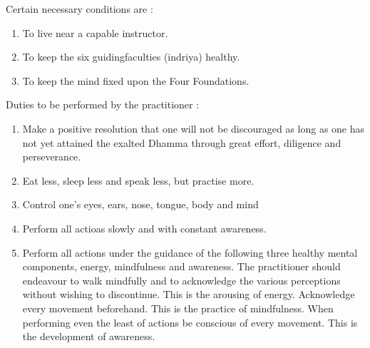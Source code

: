 \documentclass[a5paper,10pt,english]{book}
\begin{document}
\sphinxAtStartPar
{} Certain necessary conditions are :
\begin{enumerate}
%
\item {} 
\sphinxAtStartPar
To live near a capable instructor.

\item {} 
\sphinxAtStartPar
To keep the six guiding\sphinxhyphen{}faculties (indriya) healthy.

\item {} 
\sphinxAtStartPar
To keep the mind fixed upon the Four Foundations.

\end{enumerate}

\sphinxAtStartPar
Duties to be performed by the practitioner :\sphinxhyphen{}
\begin{enumerate}
%
\item {} 
\sphinxAtStartPar
Make a positive resolution that one will not be discouraged as long as one has not yet attained the exalted Dhamma through great effort, diligence and perseverance.

\item {} 
\sphinxAtStartPar
Eat less, sleep less and speak less, but practise more.

\item {} 
\sphinxAtStartPar
Control one’s eyes, ears, nose, tongue, body and mind

\item {} 
\sphinxAtStartPar
Perform all actioas slowly and with constant awareness.

\item {} 
\sphinxAtStartPar
Perform all actions under the guidance of the following three healthy mental components, energy, mindfulness and awareness. The practitioner should endeavour to walk mindfully and to acknowledge the various perceptions without wishing to discontinue. This is the arousing of energy. Acknowledge every movement beforehand. This is the practice of mindfulness. When performing even the least of actions be conscious of every movement. This is the development of awareness.

\end{enumerate}
\end{document}
